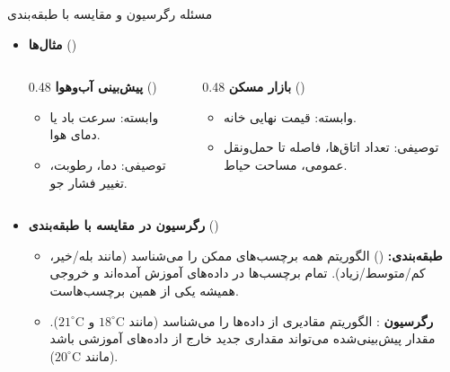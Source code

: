 \begin{frame}{مسئله رگرسیون و مقایسه با طبقه‌بندی}{}
  \begin{itemize}
    \item \textbf{مثال‌ها} ()
    \begin{columns}[T]
      \begin{column}{0.48\textwidth}
        \textbf{پیش‌بینی آب‌وهوا} ()
        \begin{itemize}
          \item وابسته: سرعت باد یا دمای هوا.
          \item توصیفی: دما، رطوبت، تغییر فشار جو.
        \end{itemize}
      \end{column}
      \begin{column}{0.48\textwidth}
        \textbf{بازار مسکن} ()
        \begin{itemize}
          \item وابسته: قیمت نهایی خانه.
          \item توصیفی: تعداد اتاق‌ها، فاصله تا حمل‌ونقل عمومی، مساحت حیاط.
        \end{itemize}
      \end{column}
    \end{columns}
    \vspace{0.25cm}
    \item \textbf{رگرسیون در مقایسه با طبقه‌بندی} ()
    \begin{itemize}
      \item \textbf{طبقه‌بندی:} () الگوریتم همه برچسب‌های ممکن را می‌شناسد (مانند بله/خیر، کم/متوسط/زیاد). تمام برچسب‌ها در داده‌های آموزش آمده‌اند و خروجی همیشه یکی از همین برچسب‌هاست.
      \item \textbf{رگرسیون} : الگوریتم مقادیری از داده‌ها را می‌شناسد (مانند $18^\circ\mathrm{C}$ و $21^\circ\mathrm{C}$). مقدار پیش‌بینی‌شده می‌تواند مقداری جدید خارج از داده‌های آموزشی باشد (مانند $20^\circ\mathrm{C}$).
    \end{itemize}
  \end{itemize}
\end{frame}

